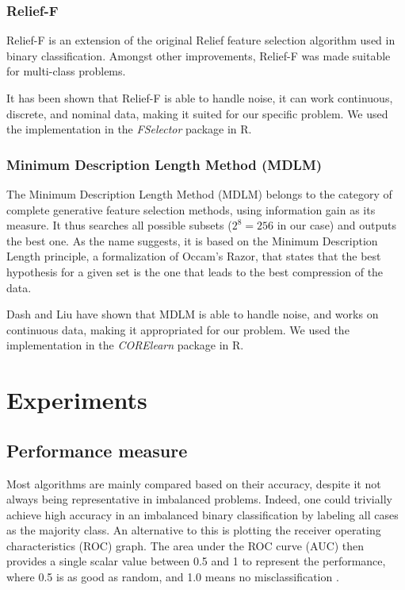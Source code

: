 \documentclass{article}
\begin{document}
\subsubsection{Relief-F}

Relief-F\cite{kononenko1994estimating} is an extension of the original Relief feature selection algorithm used in binary classification\cite{kira1992feature}. Amongst other improvements, Relief-F was made suitable for multi-class problems.

It has been shown that Relief-F is able to handle noise\cite{dash1997feature, robnik2003theoretical}, it can work continuous, discrete, and nominal data\cite{dash1997feature}, making it suited for our specific problem. We used the implementation in the \textit{FSelector} package in R.
	

\subsubsection{Minimum Description Length Method (MDLM)}

The Minimum Description Length Method (MDLM) belongs to the category of complete generative feature selection methods, using information gain as its measure\cite{sheinvald1990modeling}. It thus searches all possible subsets ($2^{8}=256$ in our case) and outputs the best one. As the name suggests, it is based on the Minimum Description Length principle, a formalization of Occam's Razor, that states that the best hypothesis for a given set is the one that leads to the best compression of the data\cite{rissanen1978modeling}.

Dash and Liu have shown that MDLM is able to handle noise, and works on continuous data\cite{dash1997feature}, making it appropriated for our problem. We used the implementation in the \textit{CORElearn} package in R\cite{procR}.

\section{Experiments}

\subsection{Performance measure}

Most algorithms are mainly compared based on their accuracy, despite it not always being representative in imbalanced problems\cite{sokolova2006beyond}. Indeed, one could trivially achieve high accuracy in an imbalanced binary classification by labeling all cases as the majority class. 
An alternative to this is plotting the receiver operating characteristics (ROC) graph. The area under the ROC curve (AUC) then provides a single scalar value between 0.5 and 1 to represent the performance, where 0.5 is as good as random, and 1.0 means no misclassification \cite{fawcett2006introduction}.
\end{document}
